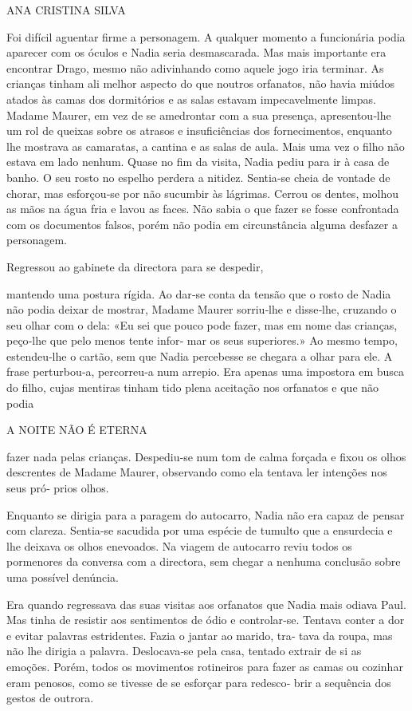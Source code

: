 ANA CRISTINA SILVA

Foi difícil aguentar firme a personagem. A qualquer momento a
funcionária podia aparecer com os óculos e Nadia seria desmascarada. Mas
mais importante era encontrar Drago, mesmo não adivinhando como aquele
jogo iria terminar. As crianças tinham ali melhor aspecto do que noutros
orfanatos, não havia miúdos atados às camas dos dormitórios e as salas
estavam impecavelmente limpas. Madame Maurer, em vez de se amedrontar
com a sua presença, apresentou‑lhe um rol de queixas sobre os atrasos e
insuficiências dos fornecimentos, enquanto lhe mostrava as camaratas, a
cantina e as salas de aula. Mais uma vez o filho não estava em lado
nenhum. Quase no fim da visita, Nadia pediu para ir à casa de banho. O
seu rosto no espelho perdera a nitidez. Sentia‑se cheia de vontade de
chorar, mas esforçou‑se por não sucumbir às lágrimas. Cerrou os dentes,
molhou as mãos na água fria e lavou as faces. Não sabia o que fazer se
fosse confrontada com os documentos falsos, porém não podia em
circunstância alguma desfazer a personagem.

Regressou ao gabinete da directora para se despedir,

mantendo uma postura rígida. Ao dar‑se conta da tensão que o rosto de
Nadia não podia deixar de mostrar, Madame Maurer sorriu‑lhe e disse‑lhe,
cruzando o seu olhar com o dela: «Eu sei que pouco pode fazer, mas em
nome das crianças, peço‑lhe que pelo menos tente infor‑ mar os seus
superiores.» Ao mesmo tempo, estendeu‑lhe o cartão, sem que Nadia
percebesse se chegara a olhar para ele. A frase perturbou‑a, percorreu‑a
num arrepio. Era apenas uma impostora em busca do filho, cujas mentiras
tinham tido plena aceitação nos orfanatos e que não podia

A NOITE NÃO É ETERNA

fazer nada pelas crianças. Despediu‑se num tom de calma forçada e fixou
os olhos descrentes de Madame Maurer, observando como ela tentava ler
intenções nos seus pró‑ prios olhos.

Enquanto se dirigia para a paragem do autocarro, Nadia não era capaz de
pensar com clareza. Sentia‑se sacudida por uma espécie de tumulto que a
ensurdecia e lhe deixava os olhos enevoados. Na viagem de autocarro
reviu todos os pormenores da conversa com a directora, sem chegar a
nenhuma conclusão sobre uma possível denúncia.

Era quando regressava das suas visitas aos orfanatos que Nadia mais
odiava Paul. Mas tinha de resistir aos sentimentos de ódio e
controlar‑se. Tentava conter a dor e evitar palavras estridentes. Fazia
o jantar ao marido, tra‑ tava da roupa, mas não lhe dirigia a palavra.
Deslocava‑se pela casa, tentado extrair de si as emoções. Porém, todos
os movimentos rotineiros para fazer as camas ou cozinhar eram penosos,
como se tivesse de se esforçar para redesco‑ brir a sequência dos gestos
de outrora.

